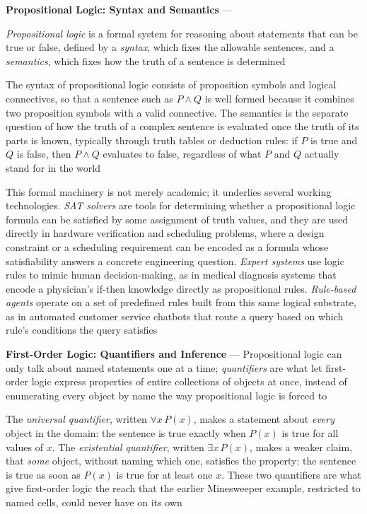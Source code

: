 \textbf{Propositional Logic: Syntax and Semantics} --- \begin{definition}
  \emph{Propositional logic} is a formal system for reasoning about
  statements that can be true or false, defined by a \emph{syntax}, which
  fixes the allowable sentences, and a \emph{semantics}, which fixes how
  the truth of a sentence is determined
\end{definition}
The syntax of propositional logic consists of proposition symbols and
logical connectives, so that a sentence such as $P \land Q$ is well formed
because it combines two proposition symbols with a valid connective. The
semantics is the separate question of how the truth of a complex sentence
is evaluated once the truth of its parts is known, typically through truth
tables or deduction rules: if $P$ is true and $Q$ is false, then $P \land
Q$ evaluates to false, regardless of what $P$ and $Q$ actually stand for in
the world

This formal machinery is not merely academic; it underlies several working
technologies. \emph{SAT solvers} are tools for determining whether a
propositional logic formula can be satisfied by some assignment of truth
values, and they are used directly in hardware verification and scheduling
problems, where a design constraint or a scheduling requirement can be
encoded as a formula whose satisfiability answers a concrete engineering
question. \emph{Expert systems} use logic rules to mimic human
decision-making, as in medical diagnosis systems that encode a physician's
if-then knowledge directly as propositional rules. \emph{Rule-based agents}
operate on a set of predefined rules built from this same logical
substrate, as in automated customer service chatbots that route a query
based on which rule's conditions the query satisfies

\textbf{First-Order Logic: Quantifiers and Inference} --- Propositional
logic can only talk about named statements one at a time; \emph{quantifiers}
are what let first-order logic express properties of entire collections of
objects at once, instead of enumerating every object by name the way
propositional logic is forced to

The \emph{universal quantifier}, written $\forall x\, P(x)$, makes a
statement about \emph{every} object in the domain: the sentence is true
exactly when $P(x)$ is true for all values of $x$. The \emph{existential
quantifier}, written $\exists x\, P(x)$, makes a weaker claim, that
\emph{some} object, without naming which one, satisfies the property: the
sentence is true as soon as $P(x)$ is true for at least one $x$. These two
quantifiers are what give first-order logic the reach that the earlier
Minesweeper example, restricted to named cells, could never have on its
own

